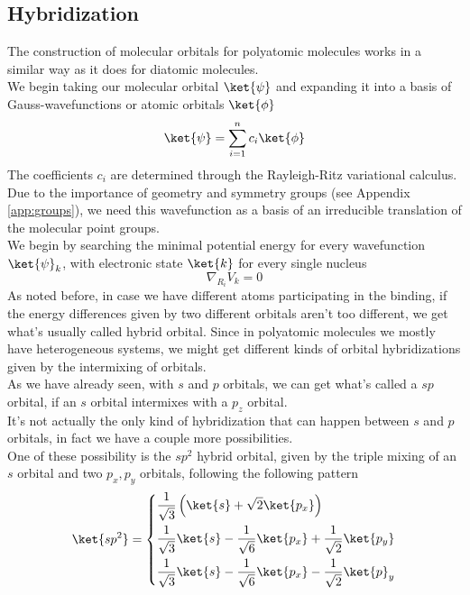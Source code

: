 \documentclass[a4paper, 11pt]{book}
\newcommand{\1}{\opr{\mathds{1}}}
\theoremstyle{plain}
\begin{document}
	\subsection{Hybridization}
	The construction of molecular orbitals for polyatomic molecules works in a similar way as it does for diatomic molecules.\\
	We begin taking our molecular orbital $\ket{\psi}$ and expanding it into a basis of Gauss-wavefunctions or atomic orbitals $\ket{\phi}$
	\begin{equation*}
		\ket{\psi}=\sum_{i=1}^nc_i\ket{\phi}
	\end{equation*}
	The coefficients $c_i$ are determined through the Rayleigh-Ritz variational calculus. Due to the importance of geometry and symmetry groups (see Appendix \ref{app:groups}), we need this wavefunction as a basis of an irreducible translation of the molecular point groups.\\
	We begin by searching the minimal potential energy for every wavefunction $\ket{\psi}_k$, with electronic state $\ket{k}$ for every single nucleus
	\begin{equation*}
		\nabla_{R_i}V_k=0
	\end{equation*}
	As noted before, in case we have different atoms participating in the binding, if the energy differences given by two different orbitals aren't too different, we get what's usually called hybrid orbital. Since in polyatomic molecules we mostly have heterogeneous systems, we might get different kinds of orbital hybridizations given by the intermixing of orbitals.\\
	As we have already seen, with $s$ and $p$ orbitals, we can get what's called a $sp$ orbital, if an $s$ orbital intermixes with a $p_z$ orbital.\\
	It's not actually the only kind of hybridization that can happen between $s$ and $p$ orbitals, in fact we have a couple more possibilities.\\
	One of these possibility is the $sp^2$ hybrid orbital, given by the triple mixing of an $s$ orbital and two $p_x,p_y$ orbitals, following the following pattern
	\begin{equation}
		\ket{sp^2}=\left\{\begin{aligned}
				&\frac{1}{\sqrt{3}}\left( \ket{s}+\sqrt{2}\ket{p_x} \right)\\
				&\frac{1}{\sqrt{3}}\ket{s}-\frac{1}{\sqrt{6}}\ket{p_x}+\frac{1}{\sqrt{2}}\ket{p_y}\\
				&\frac{1}{\sqrt{3}}\ket{s}-\frac{1}{\sqrt{6}}\ket{p_x}-\frac{1}{\sqrt{2}}\ket{p}_y
		\end{aligned}\right.
		\label{eq:sp2hybridization}
	\end{equation}
\end{document}
